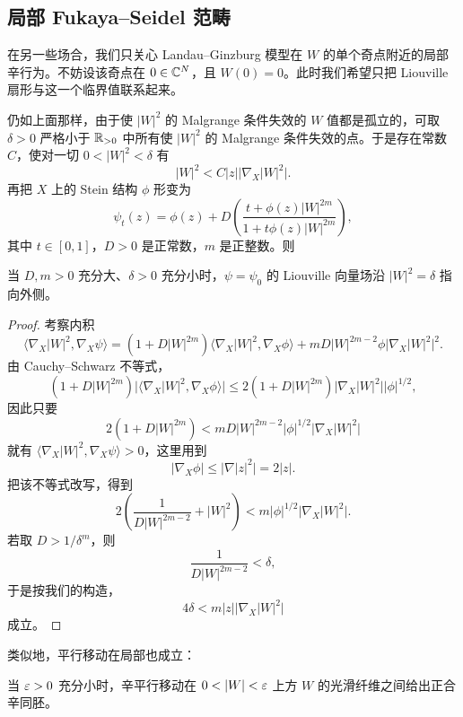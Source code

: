 \subsection{局部 Fukaya--Seidel 范畴}

在另一些场合，我们只关心 Landau--Ginzburg 模型在 $W$ 的单个奇点附近的局部辛行为。不妨设该奇点在 $0\in\mathbb{C}^N$，且 $W(0)=0$。此时我们希望只把 Liouville 扇形与这一个临界值联系起来。

仍如上面那样，由于使 $|W|^2$ 的 Malgrange 条件失效的 $W$ 值都是孤立的，可取 $\delta>0$ 严格小于 $\mathbb{R}_{>0}$ 中所有使 $|W|^2$ 的 Malgrange 条件失效的点。于是存在常数 $C$，使对一切 $0<|W|^2<\delta$ 有
\[
|W|^2<C|z|\bigl|\nabla_X|W|^2\bigr|.
\]
再把 $X$ 上的 Stein 结构 $\phi$ 形变为
\[
\psi_t(z)=\phi(z)+D\left(\frac{t+\phi(z)|W|^{2m}}{1+t\phi(z)|W|^{2m}}\right),
\]
其中 $t\in[0,1]$，$D>0$ 是正常数，$m$ 是正整数。则

\begin{lemma}\label{lem:local-psi-outward}\label{lem:2-2-1}
当 $D,m>0$ 充分大、$\delta>0$ 充分小时，$\psi=\psi_0$ 的 Liouville 向量场沿 $|W|^2=\delta$ 指向外侧。
\end{lemma}

\begin{proof}
考察内积
\[
\langle\nabla_X|W|^2,\nabla_X\psi\rangle
=(1+D|W|^{2m})\langle\nabla_X|W|^2,\nabla_X\phi\rangle
+mD|W|^{2m-2}\phi\bigl|\nabla_X|W|^2\bigr|^2.
\]
由 Cauchy--Schwarz 不等式，
\[
(1+D|W|^{2m})\bigl|\langle\nabla_X|W|^2,\nabla_X\phi\rangle\bigr|
\le 2(1+D|W|^{2m})\bigl|\nabla_X|W|^2\bigr||\phi|^{1/2},
\]
因此只要
\[
2(1+D|W|^{2m})<mD|W|^{2m-2}|\phi|^{1/2}\bigl|\nabla_X|W|^2\bigr|
\]
就有 $\langle\nabla_X|W|^2,\nabla_X\psi\rangle>0$，这里用到
\[
|\nabla_X\phi|\le\bigl|\nabla|z|^2\bigr|=2|z|.
\]
把该不等式改写，得到
\[
2\left(\frac{1}{D|W|^{2m-2}}+|W|^2\right)
<m|\phi|^{1/2}\bigl|\nabla_X|W|^2\bigr|.
\]
若取 $D>1/\delta^m$，则
\[
\frac{1}{D|W|^{2m-2}}<\delta,
\]
于是按我们的构造，
\[
4\delta<m|z|\bigl|\nabla_X|W|^2\bigr|
\]
成立。
\end{proof}

类似地，平行移动在局部也成立：

\begin{lemma}\label{lem:local-parallel-transport}\label{lem:2-2-2}
当 $\varepsilon>0$ 充分小时，辛平行移动在 $0<|W|<\eps$ 上方 $W$ 的光滑纤维之间给出正合辛同胚。
\end{lemma}

